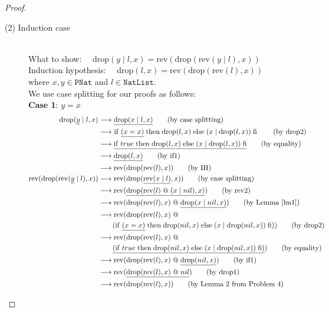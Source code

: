 \documentclass[12pt, a4paper]{article}
\newcommand{\rel}[1]{\mathrel{#1}}
\newcommand{\rmx}[1]{\mathrm{#1}}
\newcommand{\larrow}{\longrightarrow}
\newcommand{\under}{\underline}
\begin{document}
\begin{proof}
\begin{description}
\item[(2) Induction case]~\\
What to show: $\quad \rmx{drop}(y \rel{|} l, x) = \rmx{rev}(\rmx{drop}(\rmx{rev}(y \rel{|} l), x))$ \\
Induction hypothesis: $\quad \rmx{drop}(l, x) = \rmx{rev}(\rmx{drop}(\rmx{rev}(l), x))$  \\
where $x, y \in \mathtt{PNat}$ and $l \in \mathtt{NatList}$. \\
We use case splitting for our proofs as follows:\\
\textbf{Case 1}: $y = x$
\begin{align*}
\rmx{drop}(\under{y} \rel{|} l, x)
	&\larrow \under{\rmx{drop}(x \rel{|} l, x)} \tag{by case splitting} \\
	&\larrow\ \rel{\rmx{if}} \under{(x = x)} \rel{\rmx{then}} \rmx{drop}(l, x) \rel{\rmx{else}} (x \rel{|} \rmx{drop}(l, x)) \rel{\rmx{fi}} \tag{by drop2} \\
	&\larrow \under{\rel{\rmx{if}} true \rel{\rmx{then}} \rmx{drop}(l, x) \rel{\rmx{else}} (x \rel{|} \rmx{drop}(l, x)) \rel{\rmx{fi}}} \tag{by equality} \\
	&\larrow \under{\rmx{drop}(l, x)} \tag{by if1} \\
	&\larrow \rmx{rev}(\rmx{drop}(\rmx{rev}(l), x)) \tag{by IH} \\
\rmx{rev}(\rmx{drop}(\rmx{rev}(\under{y} \rel{|} l), x))
	&\larrow \rmx{rev}(\rmx{drop}(\under{\rmx{rev}(x \rel{|} l)}, x)) \tag{by case splitting} \\
	&\larrow \rmx{rev}(\under{\rmx{drop}(\rmx{rev}(l) \rel{@} (x \rel{|} nil), x)}) \tag{by rev2} \\
	&\larrow \rmx{rev}(\rmx{drop}(\rmx{rev}(l), x) \rel{@} \under{\rmx{drop}(x \rel{|} nil, x)}) \tag{by Lemma~\ref{lm1}} \\
	&\larrow \rmx{rev}(\rmx{drop}(\rmx{rev}(l), x) \rel{@} \\
	&\quad \quad (\rel{\rmx{if}} \under{(x = x)} \rel{\rmx{then}} \rmx{drop}(nil, x) \rel{\rmx{else}} (x \rel{|} \rmx{drop}(nil, x)) \rel{\rmx{fi}})) \tag{by drop2} \\
	&\larrow \rmx{rev}(\rmx{drop}(\rmx{rev}(l), x) \rel{@} \\
	&\quad \quad \under{(\rel{\rmx{if}} true \rel{\rmx{then}} \rmx{drop}(nil, x) \rel{\rmx{else}} (x \rel{|} \rmx{drop}(nil, x)) \rel{\rmx{fi}})}) \tag{by equality} \\
	&\larrow \rmx{rev}(\rmx{drop}(\rmx{rev}(l), x) \rel{@} \under{\rmx{drop}(nil, x)}) \tag{by if1} \\
	&\larrow \rmx{rev}(\under{\rmx{drop}(\rmx{rev}(l), x) \rel{@} nil}) \tag{by drop1} \\
	&\larrow \rmx{rev}(\rmx{drop}(\rmx{rev}(l), x)) \tag{by Lemma 2 from Problem 4}
\end{align*}


\end{description}
\end{proof}
\end{document}
